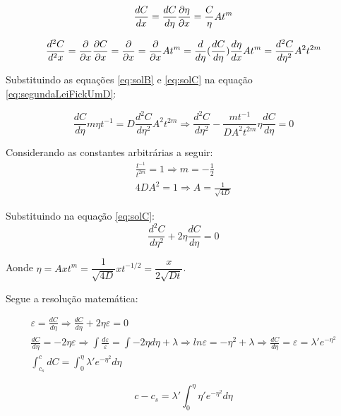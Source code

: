 \documentclass[]{politex}
\begin{document}
\begin{equation} \label{eq:solB}
 \frac{dC}{dx} = \frac{dC}{d\eta}\pdv{\eta}{x} = \frac{C}{\eta}At^m
\end{equation}

\begin{equation} \label{eq:solC}
 \frac{d^2C}{d^2x} = \pdv{}{x}\pdv{C}{x} = \pdv{}{x}(\frac{dC}{d\eta}At^m) = \pdv{}{x}(\frac{dC}{d\eta})At^m = \frac{d}{d\eta}(\frac{dC}{d\eta})\frac{d\eta}{dx}At^m = \frac{d^2C}{d\eta ^2}A^2t^{2m}
\end{equation}

Substituindo as equações \autoref{eq:solB} e \autoref{eq:solC} na equação \autoref{eq:segundaLeiFickUmD}:

\begin{equation} \label{eq:solD}
 \frac{dC}{d\eta}m\eta t^{-1} = D \frac{d^2C}{d\eta ^2}A^2t^{2m} \Rightarrow \frac{d^2C}{d\eta ^2} - \frac{mt^{-1}}{DA^2t^{2m}}\eta \frac{dC}{d\eta} = 0 
\end{equation}

Considerando as constantes arbitrárias a seguir:
\begin{gather*}		
	\frac{t^{-1}}{t^{2m}} = 1 \Rightarrow m = -\frac{1}{2} \\
	4DA^2 = 1 \Rightarrow A = \frac{1}{\sqrt{4D}}
\end{gather*}	

Substituindo na equação \autoref{eq:solC}:
\begin{equation} \label{eq:solE}
 \frac{d^2C}{d\eta ^2} + 2\eta \frac{dC}{d\eta} = 0
\end{equation}

Aonde $\eta = Axt^m = \dfrac{1}{\sqrt{4D}}xt^{-1/2} = \dfrac{x}{2\sqrt{Dt}}$.

Segue a resolução matemática:

\begin{gather*}		
	\varepsilon = \frac{dC}{d\eta} \Rightarrow \frac{dC}{d\eta} + 2\eta\varepsilon = 0 \\
	\frac{dC}{d\eta} = -2\eta\varepsilon \Rightarrow \int\frac{d\varepsilon}{\varepsilon} = \int -2\eta d\eta + \lambda \Rightarrow ln\varepsilon = -\eta^2 + \lambda \Rightarrow \frac{dC}{d\eta} = \varepsilon = \lambda'e^{-\eta^2} \\
	\int_{c_s}^{c} dC = \int_{0}^{\eta} \lambda'e^{-\eta^2} d\eta 
\end{gather*}	

\begin{equation} \label{eq:solF}
	c - c_s =  \lambda'\int_{0}^{\eta} \eta'e^{-\eta^2} d\eta 
\end{equation}
\end{document}

